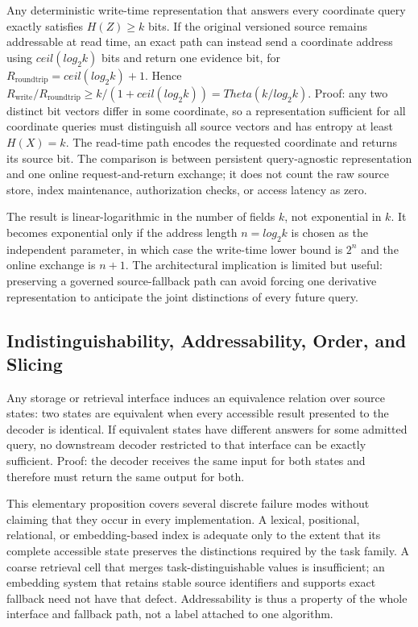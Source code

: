 \begin{proposition}
Any deterministic write-time representation that answers every coordinate query exactly satisfies $H(Z)\geq k$ bits. If the original versioned source remains addressable at read time, an exact path can instead send a coordinate address using $ceil(log_2 k)$ bits and return one evidence bit, for $R_{\mathrm{roundtrip}}=ceil(log_2 k)+1$. Hence
$R_{\mathrm{write}}/R_{\mathrm{roundtrip}}\geq k/(1+ceil(log_2 k))=Theta(k/log_2 k)$.
Proof: any two distinct bit vectors differ in some coordinate, so a representation sufficient for all coordinate queries must distinguish all source vectors and has entropy at least $H(X)=k$. The read-time path encodes the requested coordinate and returns its source bit. The comparison is between persistent query-agnostic representation and one online request-and-return exchange; it does not count the raw source store, index maintenance, authorization checks, or access latency as zero.
\end{proposition}

The result is linear-logarithmic in the number of fields $k$, not exponential in $k$. It becomes exponential only if the address length $n=log_2 k$ is chosen as the independent parameter, in which case the write-time lower bound is $2^n$ and the online exchange is $n+1$. The architectural implication is limited but useful: preserving a governed source-fallback path can avoid forcing one derivative representation to anticipate the joint distinctions of every future query.

\subsection{Indistinguishability, Addressability, Order, and Slicing}

\begin{proposition}
Any storage or retrieval interface induces an equivalence relation over source states: two states are equivalent when every accessible result presented to the decoder is identical. If equivalent states have different answers for some admitted query, no downstream decoder restricted to that interface can be exactly sufficient. Proof: the decoder receives the same input for both states and therefore must return the same output for both.
\end{proposition}

This elementary proposition covers several discrete failure modes without claiming that they occur in every implementation. A lexical, positional, relational, or embedding-based index is adequate only to the extent that its complete accessible state preserves the distinctions required by the task family. A coarse retrieval cell that merges task-distinguishable values is insufficient; an embedding system that retains stable source identifiers and supports exact fallback need not have that defect. Addressability is thus a property of the whole interface and fallback path, not a label attached to one algorithm.

